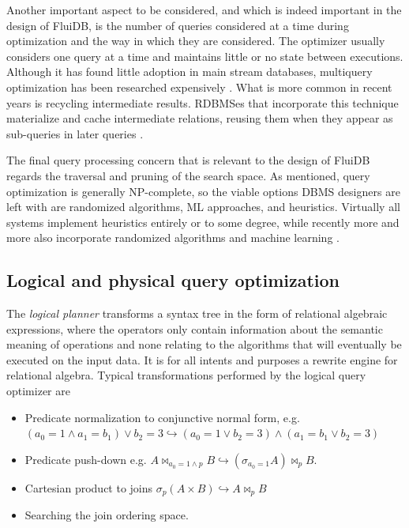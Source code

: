Another important aspect to be considered, and which is indeed
important in the design of FluiDB, is the number of queries considered
at a time during optimization and the way in which they are
considered. The optimizer usually considers one query at a time and
maintains little or no state between executions. Although it has found
little adoption in main stream databases, multiquery optimization has
been researched expensively
\cite{michiardiCachebasedMultiqueryOptimization2021,wangMultiqueryOptimizationMapreduce2013,royEfficientExtensibleAlgorithms2000,rogersMultiqueryOptimization2017}. What
is more common in recent years is recycling intermediate
results. RDBMSes that incorporate this technique materialize and cache
intermediate relations, reusing them when they appear as sub-queries
in later queries
\cite{perezHistoryawareQueryOptimization2014,nagelRecyclingPipelinedQuery2013,ivanovaArchitectureRecyclingIntermediates2010}.

The final query processing concern that is relevant to the design of
FluiDB regards the traversal and pruning of the search space. As
mentioned, query optimization is generally NP-complete, so the viable
options DBMS designers are left with are randomized algorithms, ML
approaches, and heuristics. Virtually all systems implement heuristics
entirely or to some degree, while recently more and more also
incorporate randomized algorithms
\cite{chandeGeneticOptimizationJoin2011} and machine learning
\cite{liMachineLearningDatabases2021,marcusNeoLearnedQuery2019}.

\subsection{Logical and physical query optimization}

The \emph{logical planner} transforms a syntax tree in the form of
relational algebraic expressions, where the operators only contain
information about the semantic meaning of operations and none relating
to the algorithms that will eventually be executed on the input
data. It is for all intents and purposes a rewrite engine for
relational algebra. Typical transformations performed by the logical
query optimizer are

\begin{itemize}
\item Predicate normalization to conjunctive normal form, e.g. \((a_0 = 1
  \land a_1 = b_1) \lor b_2 = 3 \hookrightarrow (a_0 = 1 \lor b_2 = 3)
  \land (a_1 = b_1 \lor b_2 = 3)\)
\item Predicate push-down e.g. \(A \Join_{a_0 = 1 \land p} B
  \hookrightarrow (\sigma_{a_0 = 1} A) \Join_p B\).
\item Cartesian product to joins \(\sigma_p ( A \times B )
  \hookrightarrow A \Join_p B\)
\item Searching the join ordering space.
\end{itemize}

